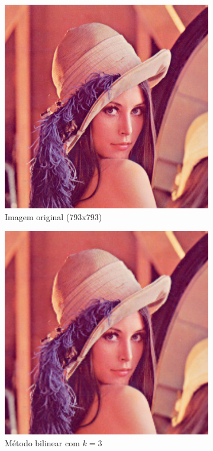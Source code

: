 \documentclass[leqno]{article}
\begin{document}
\begin{figure}[H]
    \centering
    \begin{subfigure}{.33\textwidth}
      \centering
      \includegraphics[width=.7\linewidth]{../images/lena.png}
      \caption{Imagem original (793x793) }
      \label{fig:sub1}
    \end{subfigure}%
    \begin{subfigure}{.33\textwidth}
      \centering
      \includegraphics[width=.7\linewidth]{../images/lena_bil.png}
      \caption{Método bilinear com $k = 3$}
      \label{fig:sub2}
    \end{subfigure}
    \begin{subfigure}{.33\textwidth}
        \centering

\end{subfigure}
\end{figure}
\end{document}
